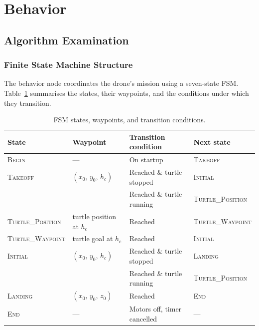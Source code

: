 \documentclass[12pt,twoside,letterpaper]{article}
\begin{document}




\section{Behavior}

\subsection{Algorithm Examination}

\subsubsection{Finite State Machine Structure}

The behavior node coordinates the drone's mission using a seven-state FSM. Table~\ref{tab:fsm_states} summarises the states, their waypoints, and the conditions under which they transition.

\begin{table}[htbp]
    \centering
    \caption{FSM states, waypoints, and transition conditions.}
    \label{tab:fsm_states}
    \vspace{0.1cm}
    \begin{tabular}{llll}
        \toprule
        \textbf{State} & \textbf{Waypoint} & \textbf{Transition condition} & \textbf{Next state} \\
        \midrule
        \textsc{Begin}    & ---                             & On startup                  & \textsc{Takeoff} \\
        \textsc{Takeoff}  & $(x_0,\, y_0,\, h_c)$          & Reached \& turtle stopped   & \textsc{Initial} \\
                          &                                 & Reached \& turtle running   & \textsc{Turtle\_Position} \\
        \textsc{Turtle\_Position} & turtle position at $h_c$ & Reached               & \textsc{Turtle\_Waypoint} \\
        \textsc{Turtle\_Waypoint} & turtle goal at $h_c$     & Reached               & \textsc{Initial} \\
        \textsc{Initial}  & $(x_0,\, y_0,\, h_c)$          & Reached \& turtle stopped   & \textsc{Landing} \\
                          &                                 & Reached \& turtle running   & \textsc{Turtle\_Position} \\
        \textsc{Landing}  & $(x_0,\, y_0,\, z_0)$          & Reached                     & \textsc{End} \\
        \textsc{End}      & ---                             & Motors off, timer cancelled & --- \\
        \bottomrule
    \end{tabular}
\end{table}
\end{document}
